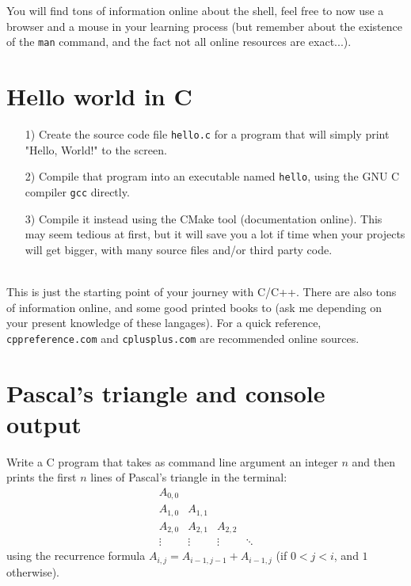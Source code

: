 \documentclass[a4paper,12pt]{article}
\begin{document}
\medskip\noindent
You will find tons of information online about the shell, feel free to now use a
browser and a mouse in your learning process (but remember about the existence
of the {\tt man} command, and the fact not all online resources are exact...).

\medskip


\section{Hello world in C}

\begin{itemize}

\item[1)] Create the source code file {\tt hello.c} for a program that will simply print "Hello, World!" to the screen.
\item[2)] Compile that program into an executable named {\tt hello}, using the
	GNU C compiler {\tt gcc} directly.
\item[3)] Compile it instead using the CMake tool (documentation online). This may seem tedious at
	first, but it will save you a lot if time when your projects will get
		bigger, with many source files and/or third party code.

\end{itemize}

\quad\\
This is just the starting point of your journey with C/C++. There are also tons of information online, and some good printed books to (ask me depending on your present knowledge of these langages). For a quick reference, {\tt cppreference.com} and {\tt cplusplus.com} are recommended online sources.\\


\section{Pascal's triangle and console output}
\noindent
Write a C program that takes as command line argument an integer $n$ and then prints the first $n$ lines of Pascal's triangle in the terminal:
$$
\begin{array}{llll}
A_{0,0}\\
A_{1,0} & A_{1,1}\\
A_{2,0} & A_{2,1} & A_{2,2}\\
\vdots & \vdots & \vdots& \ddots
\end{array}
$$
using the recurrence formula $A_{i,j} = A_{i-1,j-1} + A_{i-1,j}$ (if $0 < j < i$, and $1$ otherwise). 
\end{document}
